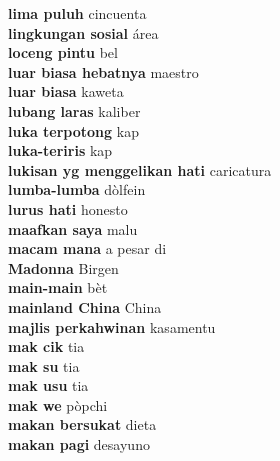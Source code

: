 \textbf{ lima puluh  } cincuenta \\
\textbf{ lingkungan sosial  } área \\
\textbf{ loceng pintu  } bel \\
\textbf{ luar biasa hebatnya  } maestro \\
\textbf{ luar biasa  } kaweta \\
\textbf{ lubang laras  } kaliber \\
\textbf{ luka terpotong  } kap \\
\textbf{ luka-teriris  } kap \\
\textbf{ lukisan yg menggelikan hati  } caricatura \\
\textbf{ lumba-lumba  } dòlfein \\
\textbf{ lurus hati  } honesto \\
\textbf{ maafkan saya  } malu \\
\textbf{ macam mana  } a pesar di \\
\textbf{ Madonna  } Birgen \\
\textbf{ main-main  } bèt \\
\textbf{ mainland China  } China \\
\textbf{ majlis perkahwinan  } kasamentu \\
\textbf{ mak cik  } tia \\
\textbf{ mak su  } tia \\
\textbf{ mak usu  } tia \\
\textbf{ mak we  } pòpchi \\
\textbf{ makan bersukat  } dieta \\
\textbf{ makan pagi  } desayuno \\
